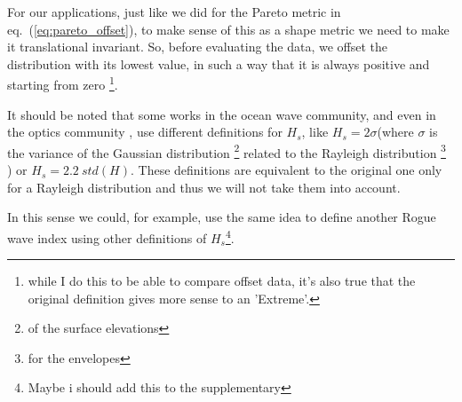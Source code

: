For our applications, just like we did for the Pareto metric in eq.~(\ref{eq:pareto_offset}), to make sense of this as a shape metric we need to make it translational invariant. 
So, before evaluating the data, we offset the distribution with its lowest value, in such a way that it is always positive and starting from zero 
\footnote{while I do this to be able to compare offset data, it's also true that the original definition gives more sense to an 'Extreme'.}.

It should be noted that some works in the ocean wave community, and even in the optics community \citep{Alexis1,...,..}, use different definitions for $H_s$, like  $H_s=2\sigma $(where $\sigma$ is the variance of the Gaussian distribution \footnote{of the surface elevations} related to the Rayleigh distribution \footnote{for the envelopes} \citep{Onorato2011}) or $H_s=2.2~std(H) $.
These definitions are equivalent to the original one only for a Rayleigh distribution and thus we will not take them into account. 


In this sense we could, for example, use the same idea to define another Rogue wave index using other definitions of $H_s$\footnote{Maybe i should add this to the supplementary}.

%	
%	
%	
%		




